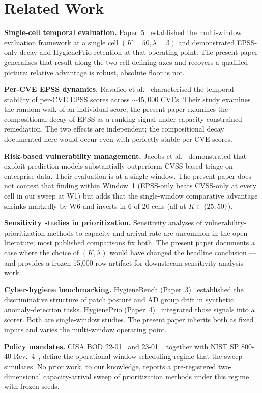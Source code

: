 \section{Related Work}

\textbf{Single-cell temporal evaluation.} Paper~5~\cite{paper5temporal}
established the multi-window evaluation framework at a single cell
$(K = 50, \lambda = 3)$ and demonstrated EPSS-only decay and
HygienePrio retention at that operating point. The present paper
generalises that result along the two cell-defining axes and recovers
a qualified picture: relative advantage is robust, absolute floor is not.

\textbf{Per-CVE EPSS dynamics.} Ravalico et al.~\cite{ravalico2025epsstemporal}
characterised the temporal stability of per-CVE EPSS scores across
$\sim 45{,}000$ CVEs. Their study examines the random walk of an
individual score; the present paper examines the compositional decay
of EPSS-as-a-ranking-signal under capacity-constrained remediation.
The two effects are independent; the compositional decay documented
here would occur even with perfectly stable per-CVE scores.

\textbf{Risk-based vulnerability management.}
Jacobs et al.~\cite{jacobs2020improving} demonstrated that
exploit-prediction models substantially outperform CVSS-based triage
on enterprise data. Their evaluation is at a single window. The
present paper does not contest that finding within Window~1 (EPSS-only
beats CVSS-only at every cell in our sweep at W1) but adds that the
single-window comparative advantage shrinks markedly by W6 and
inverts in 6 of 20 cells (all at $K \in \{25, 50\}$).

\textbf{Sensitivity studies in prioritization.} Sensitivity analyses
of vulnerability-prioritization methods to capacity and arrival rate
are uncommon in the open literature; most published comparisons fix
both. The present paper documents a case where the choice of
$(K, \lambda)$ would have changed the headline conclusion --- and
provides a frozen 15{,}000-row artifact for downstream
sensitivity-analysis work.

\textbf{Cyber-hygiene benchmarking.}
HygieneBench (Paper~3)~\cite{paper3hygienebench} established the
discriminative structure of patch posture and AD group drift in
synthetic anomaly-detection tasks.
HygienePrio (Paper~4)~\cite{paper4hygieneprio} integrated those
signals into a scorer. Both are single-window studies. The present
paper inherits both as fixed inputs and varies the multi-window
operating point.

\textbf{Policy mandates.} CISA BOD 22-01~\cite{cisa2021bod2201} and
23-01~\cite{cisa2022bod2301}, together with NIST SP 800-40
Rev.~4~\cite{nist2022sp80040r4}, define the operational
window-scheduling regime that the sweep simulates. No prior work, to
our knowledge, reports a pre-registered two-dimensional capacity-arrival
sweep of prioritization methods under this regime with frozen seeds.

